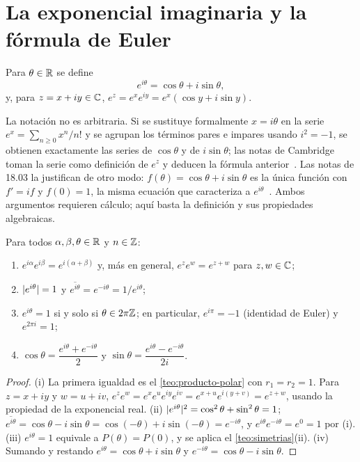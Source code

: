 \section{La exponencial imaginaria y la fórmula de Euler}

\begin{definicion}\label{def:euler}
Para $\theta\in\mathbb{R}$ se define
\[
e^{i\theta}=\cos\theta+i\sin\theta,
\]
y, para $z=x+iy\in\mathbb{C}$, $e^{z}=e^{x}e^{iy}=e^{x}(\cos y+i\sin y)$.
\end{definicion}

La notación no es arbitraria. Si se sustituye formalmente $x=i\theta$ en la serie $e^{x}=\sum_{n\ge0}x^{n}/n!$ y se agrupan los términos pares e impares usando $i^{2}=-1$, se obtienen exactamente las series de $\cos\theta$ y de $i\sin\theta$; las notas de Cambridge toman la serie como definición de $e^{z}$ y deducen la fórmula anterior~\cite[§1.2]{cambvm}. Las notas de 18.03 la justifican de otro modo: $f(\theta)=\cos\theta+i\sin\theta$ es la única función con $f'=if$ y $f(0)=1$, la misma ecuación que caracteriza a $e^{i\theta}$~\cite[§6.2]{mit1803}. Ambos argumentos requieren cálculo; aquí basta la definición y sus propiedades algebraicas.

\begin{proposicion}\label{prop:exp}
Para todos $\alpha,\beta,\theta\in\mathbb{R}$ y $n\in\mathbb{Z}$:
\begin{enumerate}
  \item $e^{i\alpha}e^{i\beta}=e^{i(\alpha+\beta)}$ y, más en general, $e^{z}e^{w}=e^{z+w}$ para $z,w\in\mathbb{C}$;
  \item $\lvert e^{i\theta}\rvert=1$ y $\overline{e^{i\theta}}=e^{-i\theta}=1/e^{i\theta}$;
  \item $e^{i\theta}=1$ si y solo si $\theta\in2\pi\mathbb{Z}$; en particular, $e^{i\pi}=-1$ (identidad de Euler) y $e^{2\pi i}=1$;
  \item $\cos\theta=\dfrac{e^{i\theta}+e^{-i\theta}}{2}$ y $\sin\theta=\dfrac{e^{i\theta}-e^{-i\theta}}{2i}$.
\end{enumerate}
\end{proposicion}

\begin{proof}
(i) La primera igualdad es el \cref{teo:producto-polar} con $r_1=r_2=1$. Para $z=x+iy$ y $w=u+iv$, $e^{z}e^{w}=e^{x}e^{u}e^{iy}e^{iv}=e^{x+u}e^{i(y+v)}=e^{z+w}$, usando la propiedad de la exponencial real. (ii) $\lvert e^{i\theta}\rvert^{2}=\cos^{2}\theta+\sin^{2}\theta=1$; $\overline{e^{i\theta}}=\cos\theta-i\sin\theta=\cos(-\theta)+i\sin(-\theta)=e^{-i\theta}$, y $e^{i\theta}e^{-i\theta}=e^{0}=1$ por (i). (iii) $e^{i\theta}=1$ equivale a $P(\theta)=P(0)$, y se aplica el \cref{teo:simetrias}(ii). (iv) Sumando y restando $e^{i\theta}=\cos\theta+i\sin\theta$ y $e^{-i\theta}=\cos\theta-i\sin\theta$.
\end{proof}

